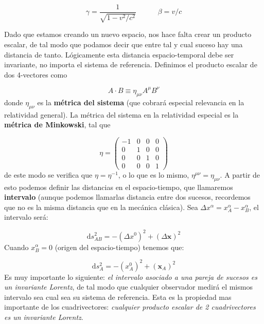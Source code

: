 \documentclass[12pt,a4paper]{book}
\numberwithin{equation}{section}
\numberwithin{figure}{section}
\newcommand{\D}{\mathrm{d}}
\newcommand{\tquad}{\quad \quad \quad}
\newcommand{\xn}{\mathbf{x}}
\begin{document}
\begin{equation}
\gamma = \frac{1}{\sqrt{1-v^2/c^2}} \tquad \beta = v/c
\end{equation}

Dado que estamos creando un nuevo espacio, nos hace falta crear un producto escalar, de tal modo que podamos decir que entre tal y cual suceso hay una distancia de tanto. Lógicamente esta distancia espacio-temporal debe ser invariante, no importa el sistema de referencia. Definimos el producto escalar de dos 4-vectores como

\begin{equation}
A \cdot B \equiv \eta_{\mu \nu} A^{\mu}  B^{\nu}
\end{equation}
donde $\eta_{\mu \nu}$ es la \textbf{métrica del sistema} (que cobrará especial relevancia en la relatividad general). La métrica del sistema en la relatividad especial es la \textbf{métrica de Minkowski}, tal que 


\begin{equation}
\eta = \begin{pmatrix}
-1 & 0 & 0 & 0 \\
 0 &  1  & 0 & 0 \\
0 & 0  & 1 & 0 \\
0 & 0  & 0 & 1
\end{pmatrix}
\end{equation}
de este modo se verifica que $\eta = \eta^{-1}$, o lo que es lo mismo, $\eta^{\mu \nu} = \eta_{\mu \nu}$. A partir de esto podemos definir las distancias en el espacio-tiempo, que llamaremos \textbf{intervalo} (aunque podemos llamarlas distancia entre dos sucesos, recordemos que no es la misma distancia que en la mecánica clásica). Sea $\Delta x^{\alpha} = x_A^{\alpha}-x_B^{\alpha}$, el intervalo será:

\begin{equation}
\D s_{AB}^2 = - (\Delta x^{0})^2 + (\Delta \xn)^2
\end{equation}
Cuando $x_{B}^\alpha = 0$ (origen del espacio-tiempo) tenemos que:

\begin{equation}
\D s_A^2 = - (x_A^0)^2 + (\xn_A)^2
\end{equation}
Es muy importante lo siguiente: \textit{el intervalo asociado a una pareja de sucesos es un invariante Lorentz}, de tal modo que cualquier observador medirá el mismos intervalo sea cual sea su sistema de referencia. Esta es la propiedad mas importante de los cuadrivectores: \textit{cualquier producto escalar de 2 cuadrivectores es un invariante Lorentz}. \\
\end{document}
